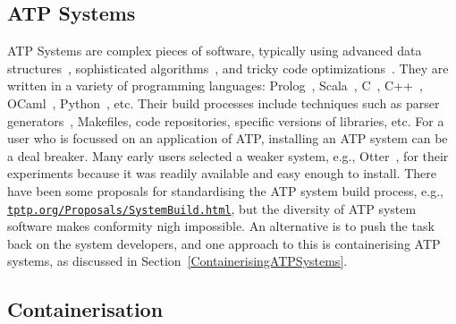 \documentclass{easychair}
\begin{document}
\subsection{ATP Systems}
\label{ATPSystems}

ATP Systems are complex pieces of software, typically using advanced data structures~\cite{Sch13}, 
sophisticated algorithms~\cite{Vor01}, and tricky code optimizations~\cite{Sch06}.
They are written in a variety of programming languages: Prolog~\cite{Ott23,Hol23}, 
Scala~\cite{SB18}, C~\cite{SCV19}, C++~\cite{RV02-AICOMM}, OCaml~\cite{Kor06}, Python~\cite{SP20}, 
etc.
Their build processes include techniques such as parser generators~\cite{Ste21}, Makefiles,
code repositories, specific versions of libraries, etc.
For a user who is focussed on an application of ATP,
installing an ATP system can be a deal breaker. 
Many early users selected a weaker system, e.g., Otter~\cite{McC03-Otter}, for their experiments 
because it was readily available and easy enough to install.
There have been some proposals for standardising the ATP system build process, e.g.,
\href{https://tptp.org/Proposals/SystemBuild.html}{\tt tptp.org/Proposals/SystemBuild.html}, 
but the diversity of ATP system software makes conformity nigh impossible.
An alternative is to push the task back on the system developers, and one approach to this is
containerising ATP systems, as discussed in Section~\ref{ContainerisingATPSystems}.

\subsection{Containerisation}
\label{Containerisation}
\end{document}
